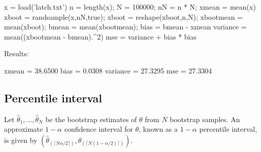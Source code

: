 \begin{labwork}
\begin{VrbM}
x = load('latch.txt') %
n = length(x); %
N = 100000; %
nN = n * N;
xmean = mean(x) %
xboot = randsample(x,nN,true); %
xboot = reshape(xboot,n,N); %
xbootmean = mean(xboot); %
bmean = mean(xbootmean); %
bias = bmean - xmean
variance = mean((xbootmean - bmean).^2)
mse = variance + bias * bias
\end{VrbM}
Results:
\begin{VrbM}
xmean = 38.6500
bias = 0.0308
variance = 27.3295
mse = 27.3304
\end{VrbM}
\end{labwork}

\subsection{Percentile interval} 
\work
Let $\hat{\theta}_1,\ldots,\hat{\theta}_N$ be the bootstrap estimates of $\theta$ from $N$ bootstrap samples. An approximate $1-\alpha$ confidence interval for $\theta$, known as a $1-\alpha$ percentile interval, is given by $(\hat{\theta}_{(\lceil N\alpha/2\rceil)},\hat{\theta}_{(\lceil N(1-\alpha/2)\rceil)})$.


